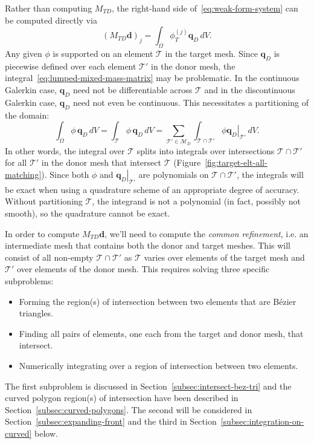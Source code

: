 \documentclass[letterpaper,10pt]{article}
\theoremstyle{definition}
\begin{document}
Rather than computing \(M_{TD}\), the right-hand side
of~\eqref{eq:weak-form-system} can be computed directly via
\begin{equation}\label{eq:lumped-mixed-mass-matrix}
\left(M_{TD} \bm{d}\right)_j = \int_{\Omega} \phi_T^{(j)} \bm{q}_D \, dV.
\end{equation}
Any given \(\phi\) is supported on an element \(\mathcal{T}\) in the
target mesh. Since \(\bm{q}_D\) is piecewise defined over each element
\(\mathcal{T}'\) in the donor mesh, the
integral~\eqref{eq:lumped-mixed-mass-matrix} may be problematic.
In the continuous Galerkin case, \(\bm{q}_D\) need not be differentiable
across \(\mathcal{T}\) and in the discontinuous Galerkin case,
\(\bm{q}_D\) need not even be continuous. This necessitates a
partitioning of the domain:
\begin{equation}
\int_{\Omega} \phi \, \bm{q}_D \, dV =
  \int_{\mathcal{T}} \phi \, \bm{q}_D \, dV =
  \sum_{\mathcal{T}' \in \mathcal{M}_D} \int_{\mathcal{T} \cap \mathcal{T}'}
    \phi \left.\bm{q}_D\right|_{\mathcal{T}'} \, dV.
\end{equation}
In other words, the integral over \(\mathcal{T}\) splits into integrals
over intersections \(\mathcal{T} \cap \mathcal{T}'\) for all
\(\mathcal{T}'\) in the donor mesh that intersect \(\mathcal{T}\)
(Figure~\ref{fig:target-elt-all-matching}). Since both \(\phi\) and
\(\left.\bm{q}_D\right|_{\mathcal{T}'}\) are polynomials on
\(\mathcal{T} \cap \mathcal{T}'\), the integrals will be exact when
using a quadrature scheme of an appropriate degree of accuracy.
Without partitioning \(\mathcal{T}\), the integrand is not a polynomial
(in fact, possibly not smooth), so the quadrature cannot be exact.

In order to compute \(M_{TD} \bm{d}\), we'll need to compute the
\emph{common refinement}, i.e. an intermediate mesh that contains
both the donor and target meshes. This will consist of all non-empty
\(\mathcal{T} \cap \mathcal{T}'\) as \(\mathcal{T}\) varies over
elements of the target mesh and \(\mathcal{T}'\) over elements of the
donor mesh. This requires solving three specific subproblems:
\begin{itemize}
\itemsep 0em
\item Forming the region(s) of intersection between two elements that
  are B\'{e}zier triangles.
\item Finding all pairs of elements, one each from the target and donor mesh,
  that intersect.
\item Numerically integrating over a region of intersection between two
  elements.
\end{itemize}
The first subproblem is discussed in
Section~\ref{subsec:intersect-bez-tri}
and the curved polygon region(s) of intersection have been described
in Section~\ref{subsec:curved-polygons}. The second will be considered
in Section~\ref{subsec:expanding-front} and the third in
Section~\ref{subsec:integration-on-curved} below.
\end{document}
